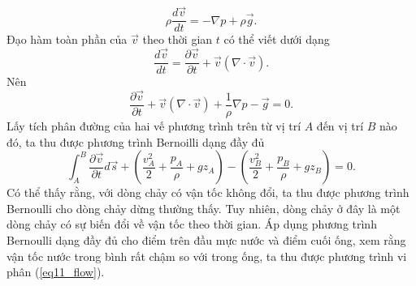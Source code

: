 \begin{enumerate}
\begin{equation}
        \rho \dfrac{d \Vec{v}}{dt} = - \nabla p + \rho \Vec{g}.
    \end{equation}
    Đạo hàm toàn phần của $\Vec{v}$ theo thời gian $t$ có thể viết dưới dạng
    \begin{equation} \label{eq14_flow}
        \dfrac{d \Vec{v}}{dt} = \dfrac{\partial \Vec{v}}{\partial t} + \Vec{v} \left( \nabla \cdot \Vec{v} \right).
    \end{equation}
    Nên
    \begin{equation} \label{eq15_flow}
        \dfrac{\partial \Vec{v}}{\partial t} + \Vec{v} \left( \nabla \cdot \Vec{v} \right) + \dfrac{1}{\rho} \nabla p - \Vec{g}=0.
    \end{equation}
    Lấy tích phân đường của hai vế phương trình trên từ vị trí $A$ đến vị trí $B$ nào đó, ta thu được phương trình Bernoilli dạng đầy đủ
    \begin{equation} \label{eq16_flow}
        \int_A^B \dfrac{\partial \Vec{v}}{\partial t} d \Vec{s} + \left( \dfrac{v_A^2}{2} + \dfrac{p_A}{\rho} + gz_A \right) - \left( \dfrac{v_B^2}{2} + \dfrac{p_B}{\rho} + gz_B \right) =0.
    \end{equation}
    Có thể thấy rằng, với dòng chảy có vận tốc không đổi, ta thu được phương trình Bernoulli cho dòng chảy dừng thường thấy. Tuy nhiên, dòng chảy ở đây là một dòng chảy có sự biến đổi về vận tốc theo thời gian. Áp dụng phương trình Bernoulli dạng đầy đủ cho điểm trên đầu mực nước và điểm cuối ống, xem rằng vận tốc nước trong bình rất chậm so với trong ống, ta thu được phương trình vi phân (\ref{eq11_flow}).
\end{enumerate}

